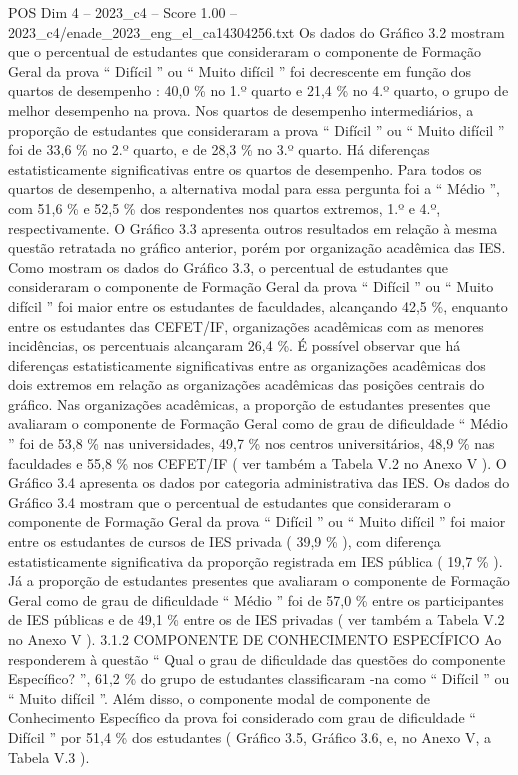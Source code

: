 \begin{textsample}{POS Dim 4 – 2023\_c4 – Score 1.00 – 2023\_c4/enade\_2023\_eng\_el\_ca14304256.txt}
Os dados do Gráfico 3.2 mostram que o percentual de estudantes que consideraram o componente de Formação Geral da prova “ Difícil ” ou “ Muito difícil ” foi decrescente em função dos quartos de desempenho : 40,0 \% no 1.º quarto e 21,4 \% no 4.º quarto, o grupo de melhor desempenho na prova.
Nos quartos de desempenho intermediários, a proporção de estudantes que consideraram a prova “ Difícil ” ou “ Muito difícil ” foi de 33,6 \% no 2.º quarto, e de 28,3 \% no 3.º quarto.
Há diferenças estatisticamente significativas entre os quartos de desempenho.
Para todos os quartos de desempenho, a alternativa modal para essa pergunta foi a “ Médio ”, com 51,6 \% e 52,5 \% dos respondentes nos quartos extremos, 1.º e 4.º, respectivamente.
O Gráfico 3.3 apresenta outros resultados em relação à mesma questão retratada no gráfico anterior, porém por organização acadêmica das IES.
Como mostram os dados do Gráfico 3.3, o percentual de estudantes que consideraram o componente de Formação Geral da prova “ Difícil ” ou “ Muito difícil ” foi maior entre os estudantes de faculdades, alcançando 42,5 \%, enquanto entre os estudantes das CEFET/IF, organizações acadêmicas com as menores incidências, os percentuais alcançaram 26,4 \%.
É possível observar que há diferenças estatisticamente significativas entre as organizações acadêmicas dos dois extremos em relação as organizações acadêmicas das posições centrais do gráfico.
Nas organizações acadêmicas, a proporção de estudantes presentes que avaliaram o componente de Formação Geral como de grau de dificuldade “ Médio ” foi de 53,8 \% nas universidades, 49,7 \% nos centros universitários, 48,9 \% nas faculdades e 55,8 \% nos CEFET/IF ( ver também a Tabela V.2 no Anexo V ).
O Gráfico 3.4 apresenta os dados por categoria administrativa das IES.
Os dados do Gráfico 3.4 mostram que o percentual de estudantes que consideraram o componente de Formação Geral da prova “ Difícil ” ou “ Muito difícil ” foi maior entre os estudantes de cursos de IES privada ( 39,9 \% ), com diferença estatisticamente significativa da proporção registrada em IES pública ( 19,7 \% ).
Já a proporção de estudantes presentes que avaliaram o componente de Formação Geral como de grau de dificuldade “ Médio ” foi de 57,0 \% entre os participantes de IES públicas e de 49,1 \% entre os de IES privadas ( ver também a Tabela V.2 no Anexo V ). 3.1.2 COMPONENTE DE CONHECIMENTO ESPECÍFICO Ao responderem à questão “ Qual o grau de dificuldade das questões do componente Específico? ”, 61,2 \% do grupo de estudantes classificaram -na como “ Difícil ” ou “ Muito difícil ”.
Além disso, o componente modal de componente de Conhecimento Específico da prova foi considerado com grau de dificuldade “ Difícil ” por 51,4 \% dos estudantes ( Gráfico 3.5, Gráfico 3.6, e, no Anexo V, a Tabela V.3 ).

\end{textsample}
